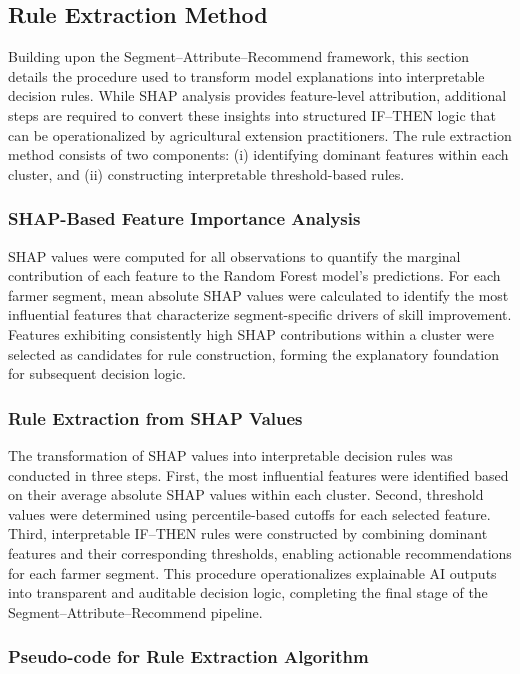 \subsection{Rule Extraction Method}

Building upon the Segment–Attribute–Recommend framework, this section details the procedure used to transform model explanations into interpretable decision rules. While SHAP analysis provides feature-level attribution, additional steps are required to convert these insights into structured IF--THEN logic that can be operationalized by agricultural extension practitioners. The rule extraction method consists of two components: (i) identifying dominant features within each cluster, and (ii) constructing interpretable threshold-based rules.

\subsubsection{SHAP-Based Feature Importance Analysis}

SHAP values were computed for all observations to quantify the marginal contribution of each feature to the Random Forest model's predictions. For each farmer segment, mean absolute SHAP values were calculated to identify the most influential features that characterize segment-specific drivers of skill improvement. Features exhibiting consistently high SHAP contributions within a cluster were selected as candidates for rule construction, forming the explanatory foundation for subsequent decision logic.

\subsubsection{Rule Extraction from SHAP Values}

The transformation of SHAP values into interpretable decision rules was conducted in three steps. First, the most influential features were identified based on their average absolute SHAP values within each cluster. Second, threshold values were determined using percentile-based cutoffs for each selected feature. Third, interpretable IF--THEN rules were constructed by combining dominant features and their corresponding thresholds, enabling actionable recommendations for each farmer segment. This procedure operationalizes explainable AI outputs into transparent and auditable decision logic, completing the final stage of the Segment–Attribute–Recommend pipeline.

\subsubsection{Pseudo-code for Rule Extraction Algorithm}


